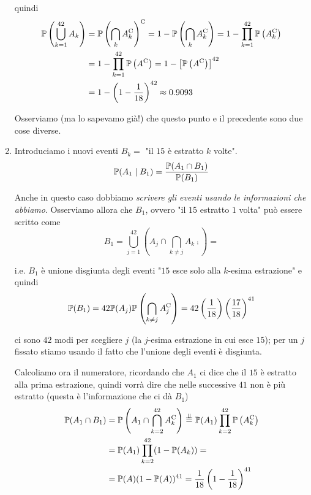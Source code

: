 \begin{enumerate}
quindi
\begin{align*}
\mathbb{P}\left(\bigcup _{k=1}^{42} A_{k}\right) & =\mathbb{P}\left(\bigcap _{k} A_{k}^{\mathrm{C}}\right)^{\mathrm{C}} =1-\mathbb{P}\left(\bigcap _{k} A_{k}^{\mathrm{C}}\right) =1-\prod _{k=1}^{42}\mathbb{P}\left( A_{k}^{\mathrm{C}}\right)\\
 & =1-\prod _{k=1}^{42}\mathbb{P}\left( A^{\mathrm{C}}\right) =1-\left[\mathbb{P}\left( A^{\mathrm{C}}\right)\right]^{42}\\
 & =1-\left( 1-\frac{1}{18}\right)^{42} \approx 0.9093
\end{align*}

\begin{oss}
Osserviamo (ma lo sapevamo già!) che questo punto e il precedente sono due cose diverse.
\end{oss}
\item Introduciamo i nuovi eventi $B_{k} =$ "il $15$ è estratto $k$ volte".\begin{equation*}
\mathbb{P}( A_{1} \mid B_{1}) =\frac{\mathbb{P}( A_{1} \cap B_{1})}{\mathbb{P}( B_{1})}
\end{equation*}

Anche in questo caso dobbiamo \textit{scrivere gli eventi usando le informazioni che abbiamo}. Osserviamo allora che $B_{1}$, ovvero "il $15$ estratto $1$ volta" può essere scritto come
\begin{equation*}
B_{1} =\bigcup _{j=1}^{42}\left( A_{j} \cap \bigcap _{k\neq j} A_{k}\comp\right) =
\end{equation*}

i.e. $B_{1}$ è unione disgiunta degli eventi "$15$ esce solo alla $k$-esima estrazione" e quindi
\begin{equation*}
\mathbb{P}( B_{1}) =42\mathbb{P}( A_{j})\mathbb{P}\left(\bigcap _{k\neq j} A_{j}^{\mathrm{C}}\right) =42\left(\frac{1}{18}\right)\left(\frac{17}{18}\right)^{41}
\end{equation*}

ci sono $42$ modi per scegliere $j$ (la $j$-esima estrazione in cui esce $15$); per un $j$ fissato stiamo usando il fatto che l'unione degli eventi è disgiunta.

Calcoliamo ora il numeratore, ricordando che $A_{1}$ ci dice che il $15$ è estratto alla prima estrazione, quindi vorrà dire che nelle successive $41$ non è più estratto (questa è l'informazione che ci dà $B_{1}$)\begin{align*}
\mathbb{P}( A_{1} \cap B_{1}) & =\mathbb{P}\left( A_{1} \cap \bigcap _{k=2}^{42} A_{k}^{\mathrm{C}}\right)\overset{\perp \!\!\! \perp }{=}\mathbb{P}( A_{1})\prod _{k=2}^{42}\mathbb{P}\left( A_{k}^{\mathrm{C}}\right)\\
 & =\mathbb{P}( A_{1})\prod _{k=2}^{42}( 1-\mathbb{P}( A_{k})) =\\
 & =\mathbb{P}( A)( 1-\mathbb{P}( A))^{41} =\frac{1}{18}\left( 1-\frac{1}{18}\right)^{41}
\end{align*}


\end{enumerate}

